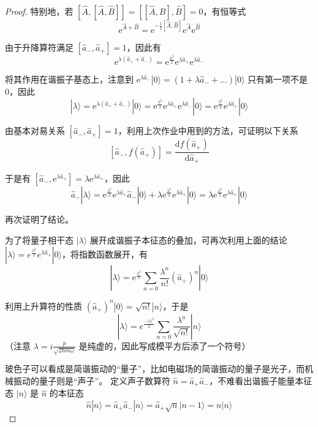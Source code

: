 \begin{proof}
特别地，若 $[\hat{A},[\hat{A}, \hat{B}]]=[[\hat{A}, \hat{B}], \hat{B}]=0$，有恒等式
$$\mathrm{e}^{\hat{A}+\hat{B}}
=\mathrm{e}^{-\frac{1}{2}[\hat{A}, \hat{B}]} \mathrm{e}^{\hat{A}} \mathrm{e}^{\hat{B}}$$

由于升降算符满足 $\left[\hat{a}_{-}, \hat{a}_{+}\right]=1$，因此有
$$\mathrm{e}^{\lambda\left(\hat{a}_{+}+\hat{a}_{-}\right)}
=\mathrm{e}^{\frac{\lambda^{2}}{2}} \mathrm{e}^{\lambda \hat{a}_{+}} \mathrm{e}^{\lambda \hat{a}_{-}}$$

将其作用在谐振子基态上，注意到 $\mathrm{e}^{\lambda \hat{a}_{-}}|0\rangle=\left(1+\lambda \hat{a}_{-}+\ldots\right)|0\rangle$ 只有第一项不是 $0$，因此
$$|\lambda\rangle=\mathrm{e}^{\lambda\left(\hat{a}_{+}+\hat{a}_{-}\right)}|0\rangle
=\mathrm{e}^{\frac{\lambda^{2}}{2}} \mathrm{e}^{\lambda \hat{a}_{+}} \mathrm{e}^{\lambda \hat{a}_{-}}|0\rangle
=\mathrm{e}^{\frac{\lambda^{2}}{2}} \mathrm{e}^{\lambda \hat{a}_{+}}|0\rangle$$

由基本对易关系 $\left[\hat{a}_{-}, \hat{a}_{+}\right]=1$，利用上次作业中用到的方法，可证明以下关系
$$\left[\hat{a}_{-}, f(\hat{a}_{+})\right]
=\frac{\mathrm{d} f(\hat{a}_{+})}{\mathrm{d} \hat{a}_{+}}$$

于是有 $\left[\hat{a}_{-}, \mathrm{e}^{\lambda \hat{a}_{+}}\right]=\lambda \mathrm{e}^{\lambda \hat{a}_{+}}$，因此
$$\hat{a}_{-}|\lambda\rangle
=\mathrm{e}^{\frac{\lambda^{2}}{2}} \mathrm{e}^{\lambda \hat{a}_{+}} \hat{a}_{-}|0\rangle
+\lambda \mathrm{e}^{\frac{\lambda^{2}}{2}} \mathrm{e}^{\lambda \hat{a}_{+}}|0\rangle
=\lambda \mathrm{e}^{\frac{\lambda^{2}}{2}} \mathrm{e}^{\lambda \hat{a}_{+}}|0\rangle$$

再次证明了结论。

为了将量子相干态 $|\lambda\rangle$ 展开成谐振子本征态的叠加，可再次利用上面的结论 $|\lambda\rangle=e^{\frac{\lambda^{2}}{2}} e^{\lambda \hat{a}_{+}}|0\rangle$，将指数函数展开，有
$$
|\lambda\rangle=\mathrm{e}^{\frac{\lambda^{2}}{2}} \sum_{n=0} \frac{\lambda^{n}}{n!}\left(\hat{a}_{+}\right)^{n}|0\rangle
$$

利用上升算符的性质 $\left(\hat{a}_{+}\right)^{n}|0\rangle=\sqrt{n!}|n\rangle$，于是
$$
|\lambda\rangle=e^{\frac{-|\lambda|^{2}}{2}} \sum_{n=0} \frac{\lambda^{n}}{\sqrt{n!}}|n\rangle
$$
（注意 $\lambda=i \frac{p}{\sqrt{2 \hbar m \omega}}$ 是纯虚的，因此写成模平方后添了一个符号）

玻色子可以看成是简谐振动的``量子''，比如电磁场的简谐振动的量子是光子，而机械振动的量子则是``声子''。
定义声子数算符 $\hat{n}=\hat{a}_{+} \hat{a}_{-}$，不难看出谐振子能量本征态 $|n\rangle$ 是 $\hat{n}$ 的本征态
$$\hat{n}|n\rangle=\hat{a}_{+} \hat{a}_{-}|n\rangle
=\hat{a}_{+} \sqrt{n}|n-1\rangle=n|n\rangle$$


\end{proof}
